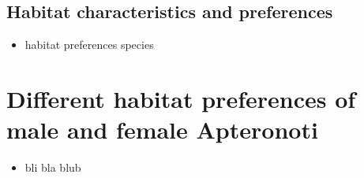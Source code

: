 
\subsection{Habitat characteristics and preferences}

\begin{itemize}
    \item habitat preferences species
\end{itemize}{}



\section{Different habitat preferences of male and female Apteronoti}

\begin{itemize}
    \item bli bla blub
\end{itemize}{}